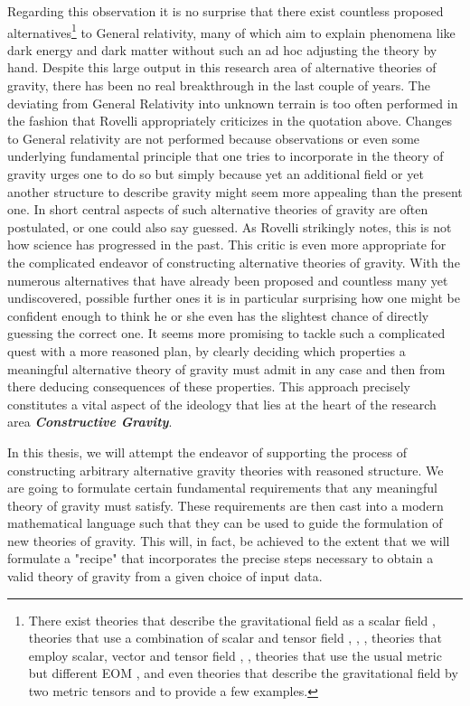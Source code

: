 Regarding this observation it is no surprise that there exist countless proposed alternatives\footnote{There exist theories that describe the gravitational field as a scalar field \cite{Scalar1} \cite{Scalar2}, theories that use a combination of scalar and tensor field \cite{ST1}, \cite{ST2}, \cite{ST3}, theories that employ scalar, vector and tensor field \cite{SVT1}, \cite{SVT2}, theories that use the usual metric but different EOM \cite{fR1}, \cite{fR2} and even theories that describe the gravitational field by two metric tensors \cite{BIM1} and \cite{BIM2} to provide a few examples.} to General relativity, many of which aim to explain phenomena like dark energy and dark matter without such an ad hoc adjusting the theory by hand. 
Despite this large output in this research area of alternative theories of gravity, there has been no real breakthrough in the last couple of years. 
The deviating from General Relativity into unknown terrain is too often performed in the fashion that Rovelli appropriately criticizes in the quotation above. Changes to General relativity are not performed because observations or even some underlying fundamental principle that one tries to incorporate in the theory of gravity urges one to do so but simply because yet an additional field or yet another structure to describe gravity might seem more appealing than the present one. In short central aspects of such alternative theories of gravity are often postulated, or one could also say guessed. As Rovelli strikingly notes, this is not how science has progressed in the past. This critic is even more appropriate for the complicated endeavor of constructing alternative theories of gravity. 
With the numerous alternatives that have already been proposed and countless many yet undiscovered, possible further ones it is in particular surprising how one might be confident enough to think he or she even has the slightest chance of directly guessing the correct one. It seems more promising to tackle such a complicated quest with a more reasoned plan, by clearly deciding which properties a meaningful alternative theory of gravity must admit in any case and then from there deducing consequences of these properties. 
This approach precisely constitutes a vital aspect of the ideology that lies at the heart of the research area \textit{\textbf{Constructive Gravity}}.

In this thesis, we will attempt the endeavor of supporting the process of constructing arbitrary alternative gravity theories with reasoned structure. 
We are going to formulate certain fundamental requirements that any meaningful theory of gravity must satisfy. These requirements are then cast into a modern mathematical language such that they can be used to guide the formulation of new theories of gravity. This will, in fact, be achieved to the extent that we will formulate a "recipe" that incorporates the precise steps necessary to obtain a valid theory of gravity from a given choice of input data. 

